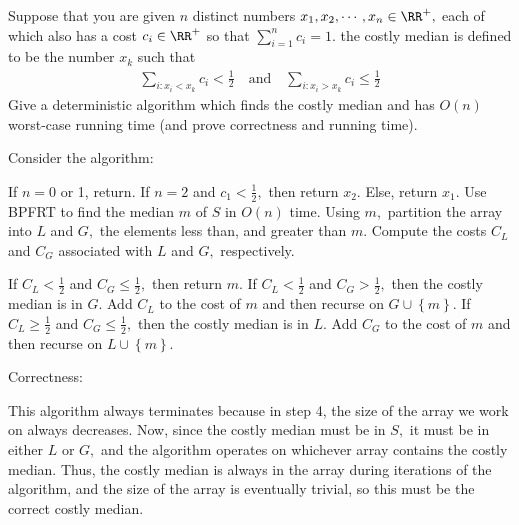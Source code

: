 \documentclass{article}
\begin{document}
Suppose that you are given $n$ distinct numbers $x_1, x_2, \cdots, x_n\in\RR^+,$ each of which also has a cost $c_i\in\RR^+$ so that $\sum_{i=1}^{n} c_i=1.$ the costly median is defined to be the number $x_k$ such that
\begin{align*}
	\sum_{i: x_i<x_k}^{} c_i<\frac{1}{2} \quad\text{and}\quad \sum_{i:x_i>x_k}^{}c_i\le\frac{1}{2}
\end{align*}
Give a deterministic algorithm which finds the costly median and has $O(n)$ worst-case running time (and prove correctness and running time).
\begin{soln}
	Consider the algorithm:
	\begin{enumerate}
			\ii If $n=0$ or 1, return. If $n=2$ and $c_1<\frac{1}{2},$ then return $x_2.$ Else, return $x_1.$
			\ii Use BPFRT to find the median $m$ of $S$ in $O(n)$ time.
			\ii Using $m,$ partition the array into $L$ and $G,$ the elements less than, and greater than $m.$
			\ii Compute the costs $C_L$ and $C_G$ associated with $L$ and $G,$ respectively.
			\begin{enumerate}[(i)]
					\ii If $C_L<\frac{1}{2}$ and $C_G\le \frac{1}{2},$ then return $m.$
					\ii If $C_L<\frac{1}{2}$ and $C_G>\frac{1}{2},$ then the costly median is in $G.$ Add $C_L$ to the cost of $m$ and then recurse on $G\cup\left\{ m \right\}.$
					\ii If $C_L\ge \frac{1}{2}$ and $C_G\le \frac{1}{2},$ then the costly median is in $L.$ Add $C_G$ to the cost of $m$ and then recurse on $L\cup \left\{ m \right\}.$
			\end{enumerate}
	\end{enumerate}

	Correctness:
	\begin{subproof}
		This algorithm always terminates because in step 4, the size of the array we work on always decreases. Now, since the costly median must be in $S,$ it must be in either $L$ or $G,$ and the algorithm operates on whichever array contains the costly median. Thus, the costly median is always in the array during iterations of the algorithm, and the size of the array is eventually trivial, so this must be the correct costly median.
	\end{subproof}


\end{soln}
\end{document}
